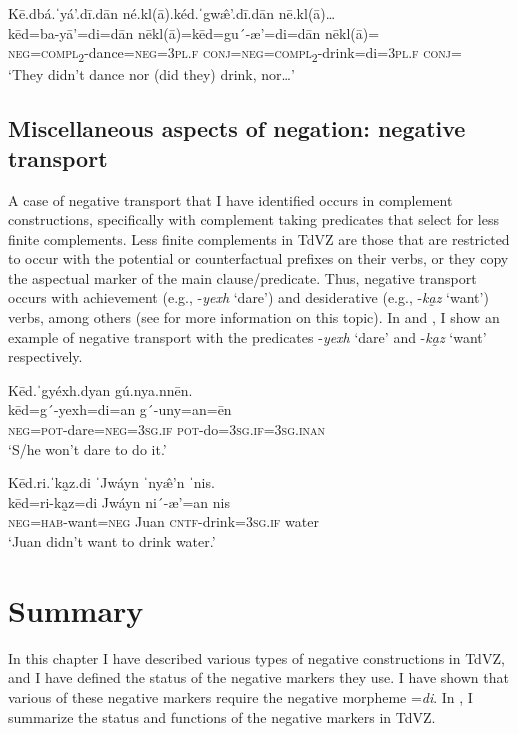 \documentclass[output=paper,colorlinks=true, citecolor=brown]{langscibook}
\begin{document}
\ea\label{ex:zap:92} 
    \glll Kē.dbá.ˈyá’.dī.dān né.kl(ā).kéd.ˈgw\^{æ}’.dī.dān nē.kl(ā)… \\ 
           kēd=ba-yā’=di=dān nēkl(ā)=kēd=gu´{}-æ’=di=dān nēkl(ā)=\\ 
           \textsc{neg}=\textsc{compl}\textsc{\textsubscript{2}}{}-dance=\textsc{neg}=\textsc{3pl.f} \textsc{conj}=\textsc{neg}=\textsc{compl}\textsc{\textsubscript{2}}{}-drink=di=\textsc{3pl.f} \textsc{conj}=\\
    \glt  ‘They didn’t dance nor (did they) drink, nor…’
\z 

\subsection{Miscellaneous aspects of negation: negative transport}\label{sec:zap:4.6}

A case of negative transport that I have identified occurs in complement constructions, specifically with complement taking predicates that select for less finite complements. Less finite complements in TdVZ are those that are restricted to occur with the potential or counterfactual prefixes on their verbs, or they copy the aspectual marker of the main clause/predicate. Thus, negative transport occurs with achievement (e.g., {}-\textit{yexh} ‘dare’) and desiderative (e.g., {}-\textit{ka̰z} ‘want’) verbs, among others (see \citealt{Gutiérrez2021} for more information on this topic). In  and , I show an example of negative transport with the predicates {}-\textit{yexh} ‘dare’ and {}-\textit{ka̰z} ‘want’ respectively.

\ea\label{ex:zap:93} 
    \glll Kēd.ˈgyéxh.dyan gú.nya.nnēn.\\ 
           kēd=g´-yexh=di=an g´-uny=an=ēn\\
          \textsc{neg}=\textsc{pot}{}-dare=\textsc{neg=3sg.if} \textsc{pot}{}-do=\textsc{3sg.if=3sg.inan}\\
    \glt  ‘S/he won’t dare to do it.’
\z 

\ea\label{ex:zap:94} 
    \glll Kēd.ri.ˈka̰z.di ˈJwáyn ˈny\^{æ}’n ˈnis.\\ 
           kēd=ri-ka̰z=di Jwáyn ni´-æ’=an nis\\
          \textsc{neg}=\textsc{hab}{}-want=\textsc{neg} Juan \textsc{cntf}{}-drink=\textsc{3sg.if} water\\
    \glt ‘Juan didn’t want to drink water.’
\z 

\section{Summary}\label{sec:zap:4.7}
\largerpage
In this chapter I have described various types of negative constructions in TdVZ, and I have defined the status of the negative markers they use. I have shown that various of these negative markers require the negative morpheme =\textit{di}. In , I summarize the status and functions of the negative markers in TdVZ.
\end{document}
